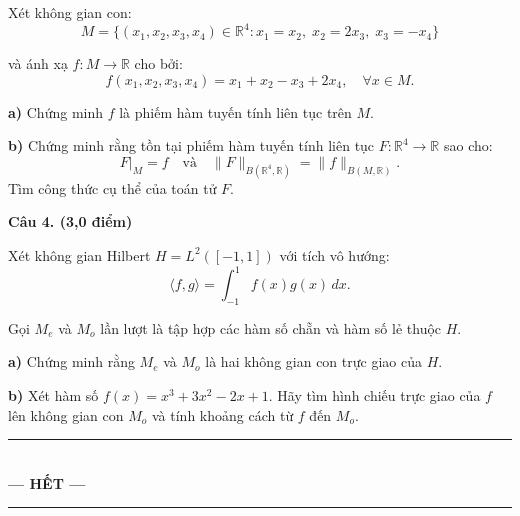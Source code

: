 Xét không gian con:
\[
    M = \{(x_1, x_2, x_3, x_4) \in \mathbb{R}^4 : x_1 = x_2, \; x_2 = 2x_3, \; x_3 = -x_4\}
\]

và ánh xạ $f : M \to \mathbb{R}$ cho bởi:
\[
    f(x_1, x_2, x_3, x_4) = x_1 + x_2 - x_3 + 2x_4, \quad \forall x \in M.
\]

\textbf{a)} Chứng minh $f$ là phiếm hàm tuyến tính liên tục trên $M$.

\vspace{0.3cm}

\textbf{b)} Chứng minh rằng tồn tại phiếm hàm tuyến tính liên tục $F : \mathbb{R}^4 \to \mathbb{R}$ sao cho:
\[
    F|_M = f \quad \text{và} \quad \|F\|_{B(\mathbb{R}^4, \mathbb{R})} = \|f\|_{B(M, \mathbb{R})}.
\]
Tìm công thức cụ thể của toán tử $F$.

\vspace{0.6cm}
\noindent\textbf{\large Câu 4. (3,0 điểm)}

\vspace{0.3cm}

Xét không gian Hilbert $H = L^2([-1, 1])$ với tích vô hướng:
\[
    \langle f,g \rangle = \int_{-1}^1 f(x)g(x)\,dx.
\]

Gọi $M_e$ và $M_o$ lần lượt là tập hợp các hàm số chẵn và hàm số lẻ thuộc $H$.

\vspace{0.3cm}

\textbf{a)} Chứng minh rằng $M_e$ và $M_o$ là hai không gian con trực giao của $H$.

\vspace{0.3cm}

\textbf{b)} Xét hàm số $f(x) = x^3 + 3x^2 - 2x + 1$. Hãy tìm hình chiếu trực giao của $f$ lên không gian con $M_o$ và tính khoảng cách từ $f$ đến $M_o$.

\vspace{1.5cm}
\begin{center}
    \rule{0.5\textwidth}{0.5pt}\\[0.3cm]
    \textbf{\large --- HẾT ---}\\[0.3cm]
    \rule{0.5\textwidth}{0.5pt}
\end{center}

\newpage
